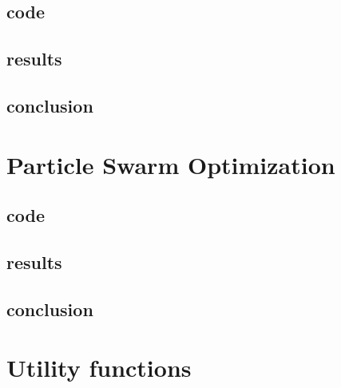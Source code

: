 \documentclass[11pt,a4paper,oneside]{article}
\begin{document}
\subsection{code}

\subsection{results}
\subsection{conclusion}
\section{Particle Swarm Optimization}
\subsection{code}


\subsection{results}
\subsection{conclusion}
\section{Utility functions}







\end{document}
